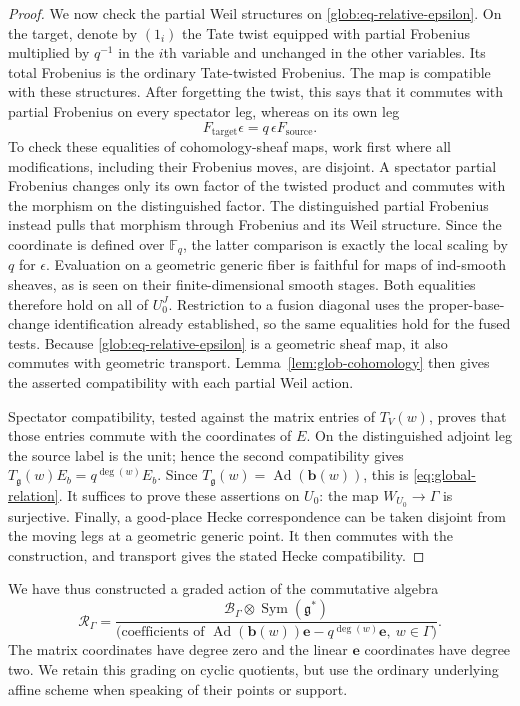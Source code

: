 \documentclass[11pt]{article}
\numberwithin{equation}{section}
\theoremstyle{definition}
\theoremstyle{remark}
\newcommand{\F}{\mathbb F}
\newcommand{\g}{\mathfrak g}
\newcommand{\Ad}{\operatorname{Ad}}
\newcommand{\Sym}{\operatorname{Sym}}
\begin{document}
\begin{proof}
We now check the partial Weil structures on
\eqref{glob:eq-relative-epsilon}.  On the target, denote by $(1_i)$
the Tate twist equipped with partial Frobenius multiplied by $q^{-1}$
in the $i$th variable and unchanged in the other variables.  Its
total Frobenius is the ordinary Tate-twisted Frobenius.  The map is
compatible with these structures.  After forgetting the twist, this
says that it commutes with partial Frobenius on every spectator leg,
whereas on its own leg
\[
 F_{\mathrm{target}}\epsilon
                   =q\,\epsilon F_{\mathrm{source}}.
\]
To check these equalities of cohomology-sheaf maps, work first where
all modifications, including their Frobenius moves, are disjoint.
A spectator partial Frobenius changes only its own factor of the
twisted product and commutes with the morphism on the distinguished
factor.  The distinguished partial Frobenius instead pulls that
morphism through Frobenius and its Weil structure.  Since the
coordinate is defined over $\F_q$, the latter comparison is exactly
the local scaling by $q$ for $\epsilon$.  Evaluation on a geometric
generic fiber is faithful for maps of ind-smooth sheaves, as is seen
on their finite-dimensional smooth stages.  Both equalities therefore
hold on all of $U_0^J$.  Restriction to a fusion diagonal uses the
proper-base-change identification already established, so the same
equalities hold for the fused tests.  Because
\eqref{glob:eq-relative-epsilon} is a geometric sheaf map, it also
commutes with geometric transport.  Lemma~\ref{lem:glob-cohomology}
then gives the asserted compatibility with each partial Weil action.

Spectator compatibility, tested against the matrix entries of
$T_V(w)$, proves that those entries commute with the coordinates of
$E$.  On the distinguished adjoint leg the source label is the unit;
hence the second compatibility gives
$T_\g(w)E_b=q^{\deg(w)}E_b$.  Since
$T_\g(w)=\Ad(\mathbf b(w))$, this is
\eqref{eq:global-relation}.  It suffices to prove these assertions
on $U_0$: the map $W_{U_0}\to\Gamma$ is surjective.
Finally, a good-place Hecke correspondence can be taken disjoint from
the moving legs at a geometric generic point.  It then commutes with
the construction, and transport gives the stated Hecke compatibility.
\end{proof}

We have thus constructed a graded action of the commutative algebra
\[
 \mathscr R_\Gamma=
 \frac{\mathscr B_\Gamma\otimes\Sym(\g^*)}
 {\bigl(\text{coefficients of }
       \Ad(\mathbf b(w))\mathbf e-q^{\deg(w)}\mathbf e,
                                      \ w\in\Gamma\bigr)}.
\]
The matrix coordinates have degree zero and the linear $\mathbf e$
coordinates have degree two.  We retain this grading on cyclic
quotients, but use the ordinary underlying affine scheme when speaking
of their points or support.
\end{document}
